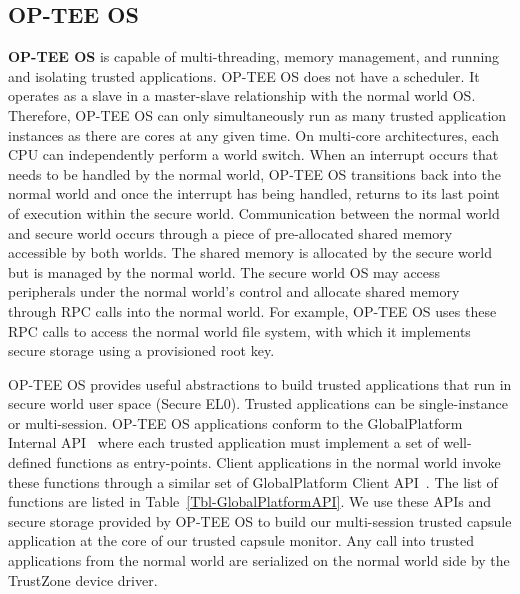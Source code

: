 \subsection{OP-TEE OS} 
 
\textbf{OP-TEE OS} is capable of multi-threading, memory management, and
running and isolating trusted applications. OP-TEE OS does not have a scheduler. It operates as a 
slave in a master-slave relationship with the normal world OS. Therefore, OP-TEE OS can only 
simultaneously run as many trusted application instances as there are cores at any given time. 
On multi-core architectures, each CPU can independently perform a world switch. When an interrupt
occurs that needs to be handled by the normal world, OP-TEE OS transitions back into the
normal world and once the interrupt has being handled, returns to its last point of execution within 
the secure world. Communication between the normal world and secure world occurs through a piece of 
pre-allocated shared memory accessible by both worlds. The shared memory is allocated by 
the secure world but is managed by the normal world. The secure world OS may access peripherals 
under the normal world's control and allocate shared memory through RPC calls into the normal world. 
For example, OP-TEE OS uses these RPC calls to access the normal world file system, with which it 
implements secure storage using a provisioned root key. 

OP-TEE OS provides useful abstractions to build trusted applications that run in secure world 
user space (Secure EL0). Trusted applications can be single-instance or multi-session. 
OP-TEE OS applications conform to the GlobalPlatform Internal API~\cite{globalplatformAPI} where 
each trusted application must implement a set of well-defined functions as entry-points. Client 
applications in the normal world invoke these functions through a similar set of GlobalPlatform 
Client API~\cite{globalplatformAPI}. The list of functions are listed in 
Table~\ref{Tbl-GlobalPlatformAPI}. We use these APIs and secure storage provided by OP-TEE OS to build 
our multi-session trusted capsule application at the core of our trusted capsule monitor. Any call into 
trusted applications from the normal world are serialized on the normal world side by the TrustZone 
device driver.   

